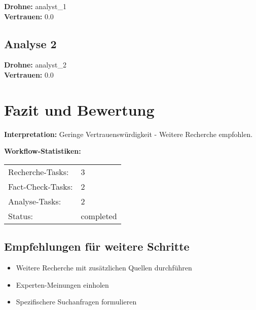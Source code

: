 \documentclass[12pt,a4paper]{article}
\begin{document}
\textbf{Drohne:} analyst\_1\\
\textbf{Vertrauen:} 0.0%

\subsection{Analyse 2}

\textbf{Drohne:} analyst\_2\\
\textbf{Vertrauen:} 0.0%


\newpage
\section{Fazit und Bewertung}


\textbf{Interpretation:} Geringe Vertrauenswürdigkeit - Weitere Recherche empfohlen.

\textbf{Workflow-Statistiken:}
\begin{tabular}{ll}
Recherche-Tasks: & 3 \\
Fact-Check-Tasks: & 2 \\
Analyse-Tasks: & 2 \\
Status: & completed \\
\end{tabular}

\subsection{Empfehlungen für weitere Schritte}

\begin{itemize}
\item Weitere Recherche mit zusätzlichen Quellen durchführen
\item Experten-Meinungen einholen
\item Spezifischere Suchanfragen formulieren
\end{itemize}
\end{document}
